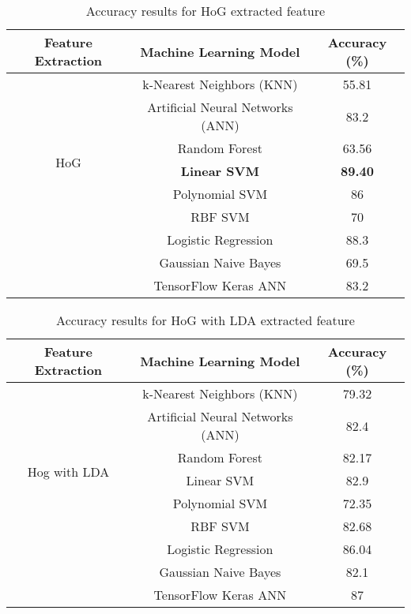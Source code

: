 \documentclass[a4paper]{article}
\theoremstyle{plain}
\theoremstyle{definition}
\begin{document}
\begin{table}[htbp]
\centering
\Large
\caption{Accuracy results for HoG extracted feature}
\label{tab:results}
\begin{tabular}{|c|c|c|}
\hline
\textbf{Feature Extraction} & \textbf{Machine Learning Model} & \textbf{Accuracy (\%)} \\ \hline
\multirow{7}{*}{HoG} & k-Nearest Neighbors (KNN) & 55.81 \\ \cline{2-3} 
 & Artificial Neural Networks (ANN) & 83.2 \\ \cline{2-3} 
 & Random Forest & 63.56 \\ \cline{2-3} 
 & \textbf {Linear SVM}& \textbf{89.40} \\ \cline{2-3} 
 & Polynomial SVM & 86 \\ \cline{2-3} 
 & RBF SVM & 70 \\ \cline{2-3} 
 & Logistic Regression & 88.3 \\ \cline{2-3} 
 & Gaussian Naive Bayes & 69.5 \\ \cline{2-3}  
 & TensorFlow Keras ANN & 83.2 \\ \hline
\end{tabular}
\end{table}







\clearpage

\begin{table}[htbp]
\centering
\Large
\caption{Accuracy results for HoG with LDA extracted feature}
\label{tab:results}
\begin{tabular}{|c|c|c|}
\hline
\textbf{Feature Extraction} & \textbf{Machine Learning Model} & \textbf{Accuracy (\%)} \\ \hline
\multirow{7}{*}{Hog with LDA } & k-Nearest Neighbors (KNN) & 79.32 \\ \cline{2-3} 
 & Artificial Neural Networks (ANN) & 82.4 \\ \cline{2-3} 
 & Random Forest & 82.17 \\ \cline{2-3} 
 &  Linear SVM & 82.9 \\ \cline{2-3} 
 & Polynomial SVM & 72.35 \\ \cline{2-3} 
 & RBF SVM & 82.68 \\ \cline{2-3} 
 & Logistic Regression & 86.04 \\ \cline{2-3} 
 & Gaussian Naive Bayes & 82.1 \\ \cline{2-3}  
 & TensorFlow Keras ANN & 87 \\ \hline
\end{tabular}
\end{table}
\end{document}
